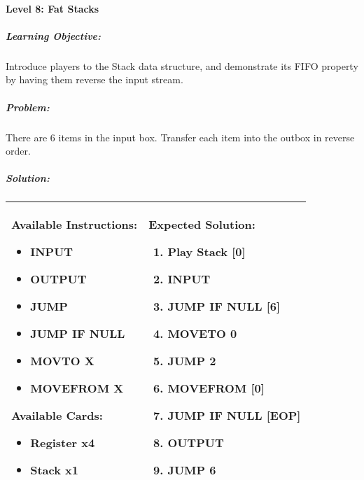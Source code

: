 \paragraph{Level 8: Fat Stacks}
\subparagraph{Learning Objective:} Introduce players to the Stack data structure, and demonstrate its FIFO property by having them reverse the input stream.

\subparagraph{Problem:} There are 6 items in the input box. Transfer each item into the outbox in reverse order.

\subparagraph{Solution:} 
\begin{center}
    \begin{tabular}{ | m{5cm} | m{9cm} | } 
        \hline
            \textbf{Available Instructions:} 
            \begin{itemize}
                \setlength\itemsep{-.35em}
                \item INPUT
                \item OUTPUT
                \item JUMP
                \item JUMP IF NULL
                \item MOVTO X
                \item MOVEFROM X
            \end{itemize}
            \textbf{Available Cards:} 
            \begin{itemize}
                \setlength\itemsep{-.35em}
                \item Register x4
                \item Stack x1
            \end{itemize}& 
            \textbf{Expected Solution:} 
            \begin{enumerate}
                \setlength\itemsep{-.35em}
                \item Play Stack [0]
                \item INPUT
                \item JUMP IF NULL [6]
                \item MOVETO 0
                \item JUMP 2
                \item MOVEFROM [0]
                \item JUMP IF NULL [EOP]
                \item OUTPUT
                \item JUMP 6
            \end{enumerate}
            \\
        \hline
    \end{tabular}
\end{center}

